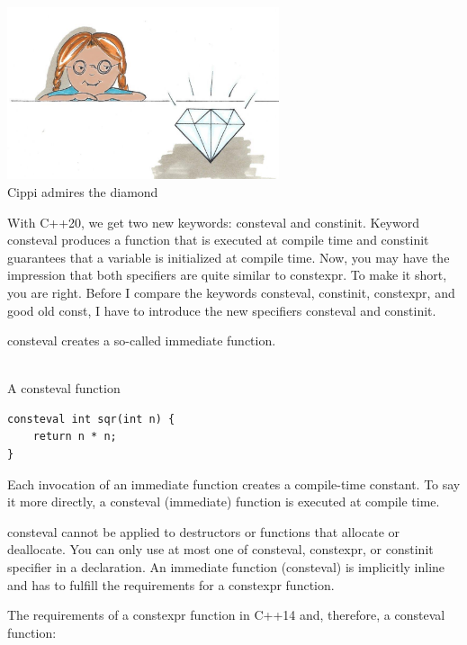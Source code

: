 \begin{center}
\includegraphics[width=0.6\textwidth]{content/3/chapter4/images/36.png}\\
Cippi admires the diamond
\end{center}

With C++20, we get two new keywords: consteval and constinit. Keyword consteval produces a function that is executed at compile time and constinit guarantees that a variable is initialized at compile time. Now, you may have the impression that both specifiers are quite similar to constexpr. To make it short, you are right. Before I compare the keywords consteval, constinit, constexpr, and good old const, I have to introduce the new specifiers consteval and constinit.



consteval creates a so-called immediate function.

\hspace*{\fill} \\ %
\noindent
A consteval function
\begin{lstlisting}[style=styleCXX]
consteval int sqr(int n) {
	return n * n;
}
\end{lstlisting}

Each invocation of an immediate function creates a compile-time constant. To say it more directly, a consteval (immediate) function is executed at compile time.

consteval cannot be applied to destructors or functions that allocate or deallocate. You can only use at most one of consteval, constexpr, or constinit specifier in a declaration. An immediate function (consteval) is implicitly inline and has to fulfill the requirements for a constexpr function.

The requirements of a constexpr function in C++14 and, therefore, a consteval function:

